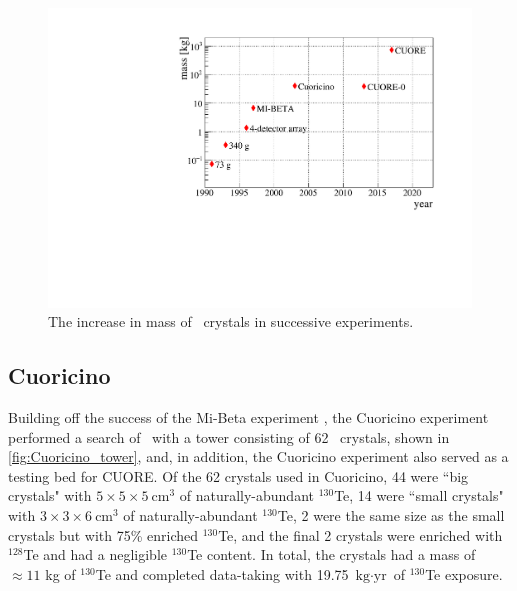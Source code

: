 \begin{figure}[htbp]
    \centering
    \includegraphics[width=\linewidth]{Figures/bolometer_mass_over_time.pdf}
    \caption[The increase in mass of \teotwo~crystals in successive experiments]
    {The increase in mass of \teotwo~crystals in successive experiments.}
    \label{fig:bolometer_mass_over_time}
\end{figure}

\subsection{Cuoricino}
Building off the success of the Mi-Beta experiment \cite{Pirro:2002gw}, the Cuoricino experiment \cite{Andreotti:2010vj} performed a search of \zeronubb~with a tower consisting of 62 \teotwo~crystals, shown in \autoref{fig:Cuoricino_tower}, and, in addition, the Cuoricino experiment also served as a testing bed for CUORE.
Of the 62 crystals used in Cuoricino, 44 were ``big crystals" with $5\times5\times5~\textrm{cm}^3$ of naturally-abundant $^{130}$Te, 14 were ``small crystals" with $3\times3\times6~\textrm{cm}^3$ of naturally-abundant $^{130}$Te, 2 were the same size as the small crystals but with 75\% enriched $^{130}$Te, and the final 2 crystals were enriched with $^{128}$Te and had a negligible $^{130}$Te content.
In total, the crystals had a mass of $\approx11$ kg of $^{130}$Te and completed data-taking with 19.75 $\textrm{kg}\cdot \textrm{yr}$ of $^{130}$Te exposure.

